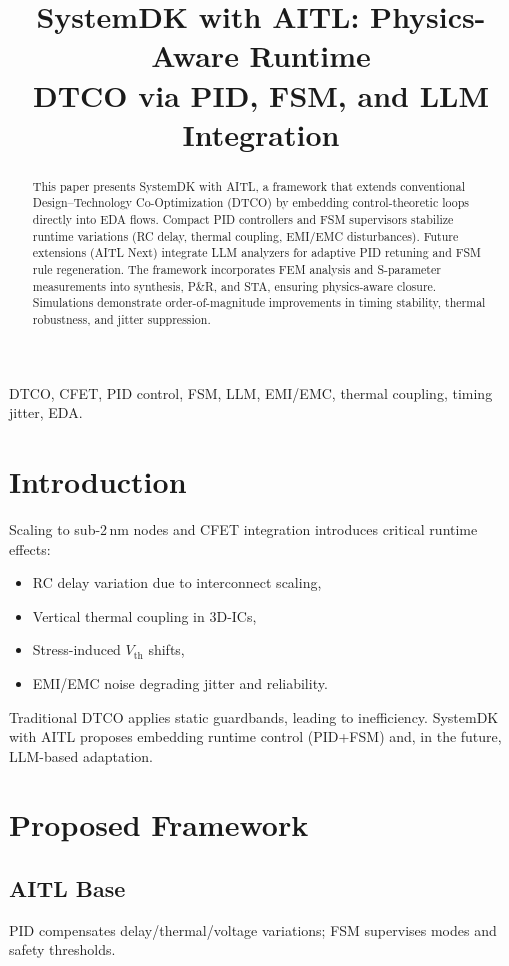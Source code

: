 \documentclass[conference]{IEEEtran}
\title{SystemDK with AITL: Physics-Aware Runtime\\
DTCO via PID, FSM, and LLM Integration}
\author{%
  \IEEEauthorblockN{Shinichi Samizo}
  \IEEEauthorblockA{Independent Semiconductor Researcher\\
  Email: \href{mailto:shin3t72@gmail.com}{shin3t72@gmail.com}}
}
\begin{document}
\maketitle

\begin{abstract}
This paper presents SystemDK with AITL, a framework that extends conventional Design--Technology Co-Optimization (DTCO) by embedding control-theoretic loops directly into EDA flows. Compact PID controllers and FSM supervisors stabilize runtime variations (RC delay, thermal coupling, EMI/EMC disturbances). Future extensions (AITL Next) integrate LLM analyzers for adaptive PID retuning and FSM rule regeneration. The framework incorporates FEM analysis and S-parameter measurements into synthesis, P\&R, and STA, ensuring physics-aware closure. Simulations demonstrate order-of-magnitude improvements in timing stability, thermal robustness, and jitter suppression.
\end{abstract}

\begin{IEEEkeywords}
DTCO, CFET, PID control, FSM, LLM, EMI/EMC, thermal coupling, timing jitter, EDA.
\end{IEEEkeywords}

\section{Introduction}
Scaling to sub-2\,nm nodes and CFET integration introduces critical runtime effects:
\begin{itemize}
  \item RC delay variation due to interconnect scaling,
  \item Vertical thermal coupling in 3D-ICs,
  \item Stress-induced $V_\text{th}$ shifts,
  \item EMI/EMC noise degrading jitter and reliability.
\end{itemize}
Traditional DTCO applies static guardbands, leading to inefficiency. SystemDK with AITL proposes embedding runtime control (PID+FSM) and, in the future, LLM-based adaptation.

\section{Proposed Framework}
\subsection{AITL Base}
PID compensates delay/thermal/voltage variations; FSM supervises modes and safety thresholds.
\end{document}
